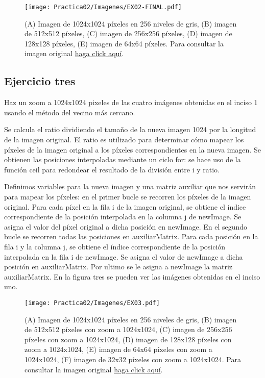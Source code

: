 \documentclass[
  journal=largetwo,
  manuscript=Practica-Dos,
  year=2024-1, %
  volume=37,
  spanish, %
]{cup-journal}
\begin{document}
\begin{figure}[hbt!]
  \centering
  \texttt{[image: Practica02/Imagenes/EX02-FINAL.pdf]}
  \caption{(A) Imagen de 1024x1024 píxeles en 256 niveles de gris, (B) imagen de 512x512 píxeles, (C) imagen de 256x256 píxeles, (D) imagen de 128x128 píxeles, (E) imagen de 64x64 píxeles. Para consultar la imagen original \href{https://drive.google.com/file/d/15F7JUApDnW06WUOVy-UCVoGNYzVpQE6U/view?usp=sharing}{haga click aquí}.}
  \label{fig_sim}
\end{figure}





\subsection{Ejercicio tres}
Haz un zoom a 1024x1024 pixeles de las cuatro imágenes obtenidas en el inciso 1 usando el método del vecino más cercano.

Se calcula el ratio dividiendo el tamaño de la nueva imagen 1024 por la longitud de la imagen original. El ratio es utilizado para determinar cómo mapear los píxeles de la imagen original a los píxeles correspondientes en la nueva imagen. Se obtienen las posiciones interpoladas mediante un ciclo for: se hace uso de la función ceil para redondear el resultado de la división entre i y ratio. 

Definimos variables para la nueva imagen y una matriz auxiliar que nos servirán para mapear los píxeles: en el primer bucle se recorren los píxeles de la imagen original. Para cada píxel en la fila i de la imagen original, se obtiene el índice correspondiente de la posición interpolada en la columna j de newImage. Se asigna el valor del píxel original a dicha posición en newImage. En el segundo bucle se recorren todas las posiciones en auxiliarMatrix. Para cada posición en la fila i y la columna j, se obtiene el índice correspondiente de la posición interpolada en la fila i de newImage. Se asigna el valor de newImage a dicha posición en auxiliarMatrix. Por ultimo se le asigna a newImage la matriz auxiliarMatrix. En la figura tres se pueden ver las imágenes  obtenidas en el inciso uno.

\begin{figure}
\centering
\texttt{[image: Practica02/Imagenes/EX03.pdf]}
\caption{(A) Imagen de 1024x1024 píxeles en 256 niveles de gris, (B) imagen de 512x512 píxeles con zoom a 1024x1024, (C) imagen de 256x256 píxeles con zoom a 1024x1024, (D) imagen de 128x128 píxeles con zoom a 1024x1024, (E) imagen de 64x64 píxeles con zoom a 1024x1024, (F) imagen de 32x32 píxeles con zoom a 1024x1024. Para consultar la imagen original \href{https://drive.google.com/file/d/1944WlXfOHoQI2MSVorNmDY6MVIbMS2os/view?usp=sharing}{haga click aquí}.}
\label{fig_sim}
\end{figure}
\end{document}
